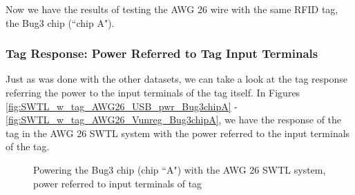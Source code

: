 \documentclass[12pt,onecolumn,titlepage]{article}
\begin{document}
Now we have the results of testing the AWG 26 wire with the same RFID tag, the Bug3 chip (``chip A").



\subsubsection{Tag Response: Power Referred to Tag Input Terminals}
\indent \indent Just as was done with the other datasets, we can take a look at the tag response referring the power to the input terminals of the tag itself. In Figures \ref{fig:SWTL_w_tag_AWG26_USB_pwr_Bug3chipA} - \ref{fig:SWTL_w_tag_AWG26_Vunreg_Bug3chipA}, we have the response of the tag in the AWG 26 SWTL system with the power referred to the input terminals of the tag. 



\begin{figure}[htbp]
	\centering
		\quad
		
	\label{fig:SWTL_w_tag_AWG26}
	\caption{Powering the Bug3 chip (chip ``A") with the AWG 26 SWTL system, power referred to input terminals of tag }
\end{figure}
\end{document}
